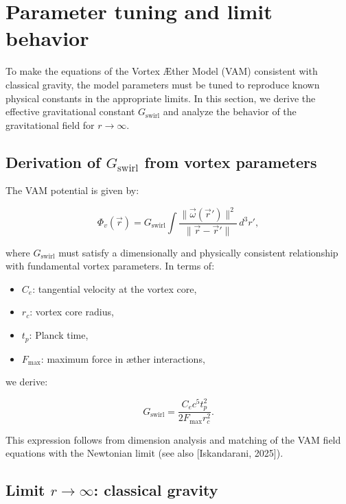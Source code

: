 \section{Parameter tuning and limit behavior}\label{sec:appendix:6}

To make the equations of the Vortex Æther Model (VAM) consistent with classical gravity, the model parameters must be tuned to reproduce known physical constants in the appropriate limits. In this section, we derive the effective gravitational constant $G_\text{swirl}$ and analyze the behavior of the gravitational field for $r \to \infty$.

\subsection{Derivation of $G_\text{swirl}$ from vortex parameters}

The VAM potential is given by:

\begin{equation}
  \Phi_v(\vec{r}) = G_\text{swirl} \int \frac{\|\vec{\omega}(\vec{r}')\|^2}{\|\vec{r} - \vec{r}'\|} \, d^3r',
\end{equation}

where $G_\text{swirl}$ must satisfy a dimensionally and physically consistent relationship with fundamental vortex parameters. In terms of:

\begin{itemize}
  \item $C_e$: tangential velocity at the vortex core,
  \item $r_c$: vortex core radius,
  \item $t_p$: Planck time,
  \item $F_\text{max}$: maximum force in æther interactions,
\end{itemize}

we derive:

\begin{equation}
  G_\text{swirl} = \frac{C_e c^5 t_p^2}{2 F_\text{max} r_c^2}.
\end{equation}

This expression follows from dimension analysis and matching of the VAM field equations with the Newtonian limit (see also [Iskandarani, 2025]).

\subsection{Limit $r \to \infty$: classical gravity}

